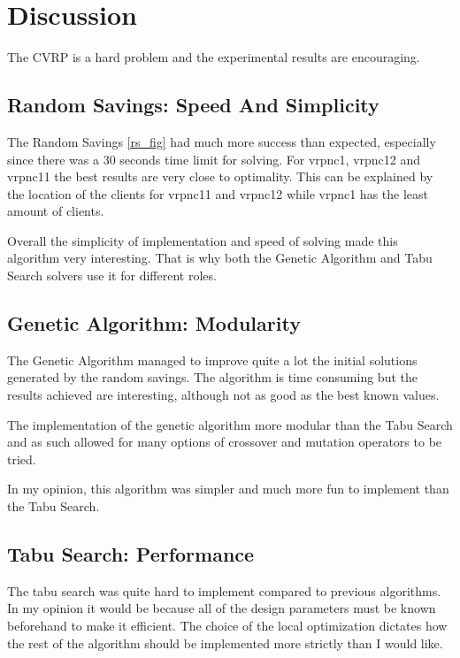 \documentclass{article} %
\begin{document}
\section{Discussion}
\label{analysis_results}

The CVRP is a hard problem and the experimental results are encouraging.\newline

\subsection{Random Savings: Speed And Simplicity}
The Random Savings \ref{rs_fig} had much more success than expected, especially since there was a 30 seconds time limit for solving. For vrpnc1, vrpnc12 and vrpnc11 the best results are very close to optimality. This can be explained by the location of the clients for vrpnc11 and vrpnc12 while vrpnc1 has the least amount of clients.\newline

Overall the simplicity of implementation and speed of solving made this algorithm very interesting. That is why both the Genetic Algorithm and Tabu Search solvers use it for different roles.



\subsection{Genetic Algorithm: Modularity}

The Genetic Algorithm managed to improve quite a lot the initial solutions generated by the random savings.
The algorithm is time consuming but the results achieved are interesting, although not as good as the best known values.\newline

The implementation of the genetic algorithm more modular than the Tabu Search and as such allowed for many options of crossover and mutation operators to be tried.\newline


In my opinion, this algorithm was simpler and much more fun to implement than the Tabu Search.


\subsection{Tabu Search: Performance}

The tabu search was quite hard to implement compared to previous algorithms. In my opinion it would be because all of the design parameters must be known beforehand to make it efficient. The choice of the local optimization dictates how the rest of the algorithm should be implemented more strictly than I would like.\newline
\end{document}
